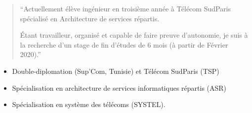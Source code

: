 \documentclass[9pt,a4paper,ragged2e,normalphoto]{altacv}
\begin{document}

\begin{fullwidth}
\makecvheader
\end{fullwidth}


\begin{quote}
``Actuellement élève ingénieur en
troisième année à Télécom SudParis spécialisé en Architecture de services répartis.

Étant travailleur, organisé et capable
de faire preuve d'autonomie, je suis à
la recherche d'un stage de fin d'études
de 6 mois (à partir de Février
2020).''
\end{quote}


\begin{itemize}
\item Double-diplomation (Sup'Com, Tunisie) et Télécom SudParis (TSP)
\item Spécialisation en architecture de services informatiques répartis (ASR)
\end{itemize}
\divider

\begin{itemize}
\item Spécialisation en système des télécoms (SYSTEL).
\end{itemize}
\divider
\end{document}
